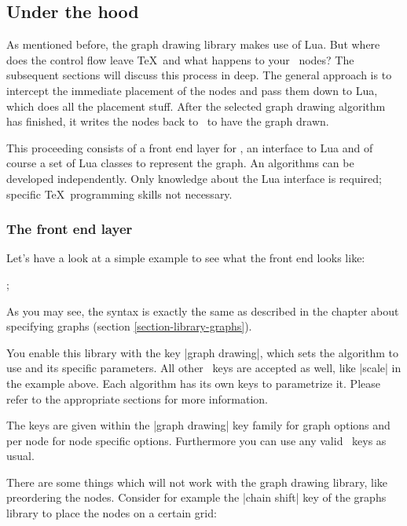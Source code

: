 \subsection{Under the hood}
As mentioned before, the graph drawing library makes use of Lua. But
where does the control flow leave \TeX\ and what happens to your
\tikzname\ nodes? The subsequent sections will discuss this process in
deep. The general approach is to intercept the immediate placement of
the nodes and pass them down to Lua, which does all the placement
stuff. After the selected graph drawing algorithm has finished, it writes
the nodes back to \tikzname\ to have the graph drawn. 

This proceeding consists of a front end layer for \tikzname, an
interface to Lua and of course a set of Lua classes to represent the
graph. An algorithms can be developed independently. Only knowledge about the Lua interface is required; specific \TeX\ programming skills not necessary.

\subsubsection{The front end layer}
Let's have a look at a simple example to see what the front end looks
like:

\begin{codeexample}[]
\tikzpicture[graph drawing={standard tree,tree scale=0.5},scale=2]
  ;
\endtikzpicture
\end{codeexample}

As you may see, the syntax is exactly the same as described in the
chapter about specifying graphs (section
\ref{section-library-graphs}).

You enable this library with the key |graph drawing|, which sets the
algorithm to use and its specific parameters. All other
\tikzname\ keys are accepted as well, like |scale| in the example
above. Each algorithm has its own keys to parametrize it. Please refer to
the appropriate sections for more information.

The keys are given within the |graph drawing| key family for graph options and per node for node specific options. Furthermore you can use any valid \tikzname\ keys as usual. 

There are some things which will not work with the graph drawing
library, like preordering the nodes. Consider for example the
|chain shift| key of the graphs library to place the nodes on a
certain grid: 

